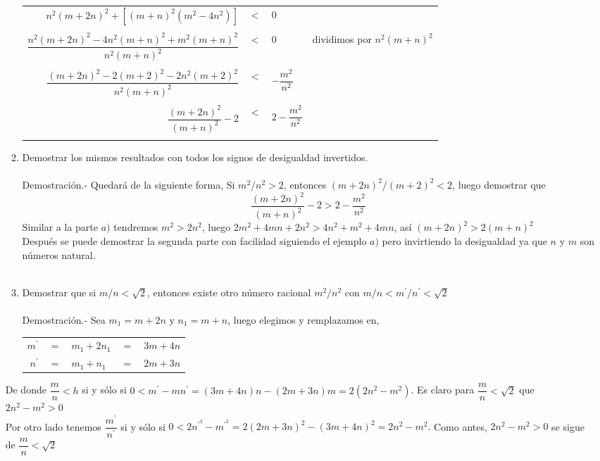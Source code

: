 \begin{enumerate}
\begin{enumerate}[\bfseries (a)]
\begin{center}
\begin{tabular}{r c l l}
      $n^2(m+2n)^2  +  \left[ (m+n)^2 (m^2 - 4n^2) \right]$&$<$&$0$&\\\\
      $\dfrac{n^2(m+2n)^2 - 4n^2(m+n)^2 + m^2(m+n)^2}{n^2(m+n)^2}$&$<$&$0$&dividimos por $n^2(m+n)^2$\\\\
      $\dfrac{(m+2n)^2 - 2(m+2)^2 - 2n^2(m+2)^2}{n^2(m+n)^2}$&$<$&$- \dfrac{m^2}{n^2}$&\\\\
      $\dfrac{(m+2n)^2}{(m+n)^2} - 2$&$<$&$2 - \dfrac{m^2}{n^2}$&\\\\
      \end{tabular}
      \end{center}

      \item Demostrar los mismos resultados con todos los signos de desigualdad invertidos. \\\\
      Demostración.- \; Quedará de la siguiente forma, Si $m^2/n^2>2$, entonces $\left( m+2n \right)^2 / \left( m + 2 \right)^2 < 2$, luego demostrar que $$\dfrac{\left( m + 2n \right)^2}{\left( m + n \right)^2} - 2 > 2 - \dfrac{m^2}{n^2}$$
      Similar a la parte $a)$ tendremos $m^2 > 2n^2$, luego $2m^2 + 4mn + 2n^2 > 4n^2 + m^2 + 4mn$, así $ (m+2n)^2 > 2(m + n)^2 $\\
      Después se puede demostrar la segunda parte con facilidad siguiendo el ejemplo $a)$ pero invirtiendo la desigualdad ya que $n$ \; y \; $m$ son números natural.\\\\

      \item Demostrar que si $m/n < \sqrt{2}$, entonces existe otro número racional $m^2 / n^2$ con $m/n < m^{'} / n^{'} < \sqrt{2}$\\\\
      Demostración.- \; Sea $m_1=m+2n$ y $n_1=m+n$, luego elegimos y remplazamos en,  
      \begin{center}
      \begin{tabular}{rclcr}
      $m^{'}$ & $=$ & $m_1+2n_1$ & $=$ & $3m+4n$\\
      $n^{'}$ & $=$ & $m_1+n_1$  & $=$ & $2m+3n$\\
      \end{tabular}
      \end{center}
      \end{enumerate}
      De donde $\dfrac{m}{n}<h$ si y sólo si $0<m^{'} - mn^{'}=(3m+4n)n - (2m + 3n)m=2(2n^2 - m^2)$. Es claro para $\dfrac{m}{n} < \sqrt{2}$ que $2n^2 - m^2 >0$\\
      Por otro lado tenemos $\dfrac{m^{'}}{n^{'}}$ si y sólo si $0<2n^{'^{2}} - m^{'^{2}}=2(2m+3n)^2-(3m+4n)^2=2n^2 - m^2.$ Como antes, $2n^2-m^2>0$ se sigue de $\dfrac{m}{n}<\sqrt{2}$\\\\
 

\end{enumerate}
